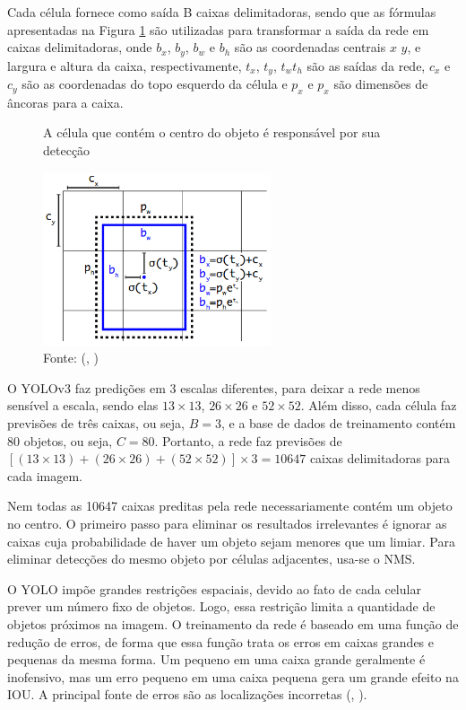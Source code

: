 \documentclass[]{politex}
\begin{document}
Cada célula fornece como saída B caixas delimitadoras, sendo que as fórmulas apresentadas na Figura \ref{fig:yolo_grid_formula} são utilizadas para transformar a saída da rede em caixas delimitadoras, onde \(b_x\), \(b_y\), \(b_w\) e \(b_h\) são as coordenadas centrais \(x\) \(y\), e largura e altura da caixa, respectivamente, \(t_x\), \(t_y\), \(t_w t_h\) são as saídas da rede, \(c_x\) e \(c_y\) são as coordenadas do topo esquerdo da célula e \(p_x\) e \(p_x\) são dimensões de âncoras para a caixa.

\begin{figure}[H]
    \caption{A célula que contém o centro do objeto é responsável por sua detecção}
    \centering
    \includegraphics[width=0.6\textwidth]{Bounding_box_dimension_and_location}
    \caption*{Fonte: (, \citeyear{yolov1})}
    \label{fig:yolo_grid_formula}
\end{figure}

O YOLOv3 faz predições em 3 escalas diferentes, para deixar a rede menos sensível a escala, sendo elas \(13\times 13\), \(26 \times 26\) e \(52 \times 52\). Além disso, cada célula faz previsões de três caixas, ou seja, \(B=3\), e a base de dados de treinamento contém 80 objetos, ou seja, \(C=80\). Portanto, a rede faz previsões de \([(13 \times 13) + (26 \times 26)+(52 \times 52)] \times 3=10647\) caixas delimitadoras para cada imagem.

Nem todas as 10647 caixas preditas pela rede necessariamente contém um objeto no centro. O primeiro passo para eliminar os resultados irrelevantes é ignorar as caixas cuja probabilidade de haver um objeto sejam menores que um limiar. Para eliminar detecções do mesmo objeto por células adjacentes, usa-se o NMS.

O YOLO impõe grandes restrições espaciais, devido ao fato de cada celular prever um número fixo de objetos. Logo, essa restrição limita a quantidade de objetos próximos na imagem. O treinamento da rede é baseado em uma função de redução de erros, de forma que essa função trata os erros em caixas grandes e pequenas da mesma forma. Um pequeno em uma caixa grande geralmente é inofensivo, mas um erro pequeno em uma caixa pequena gera um grande efeito na IOU. A principal fonte de erros são as localizações incorretas (, \citeyear{yolov3}).
\end{document}
